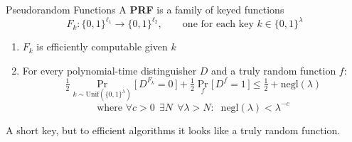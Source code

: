 \begin{frame}{Pseudorandom Functions}
A \textbf{PRF} is a family of keyed functions
$$F_k : \{0,1\}^{\ell_1} \to \{0,1\}^{\ell_2}, \qquad \text{one for each key } k \in \{0,1\}^{\lambda}$$
\begin{enumerate}
\item $F_k$ is efficiently computable given $k$
\item For every polynomial-time distinguisher $D$ and a truly random function $f$:
$$\tfrac{1}{2} \Pr_{k \sim \mathrm{Unif}(\{0,1\}^\lambda)}\big[\, D^{F_k} = 0 \,\big] + \tfrac{1}{2} \Pr_{f}\big[\, D^{f} = 1 \,\big] \leq \tfrac{1}{2} + \mathrm{negl}(\lambda)$$
$$\text{where } \forall c > 0 \;\, \exists N \;\, \forall \lambda > N : \;\; \mathrm{negl}(\lambda) < \lambda^{-c}$$
\end{enumerate}
\vspace{0.5em}
A short key, but to efficient algorithms it looks like a truly random function.

\end{frame}

